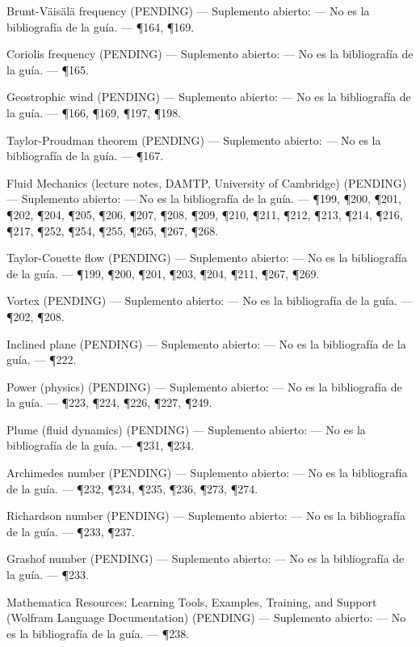\documentclass[10pt,openany]{book}
\begin{document}
\noindent Brunt-Väisälä frequency (PENDING) --- Suplemento abierto: --- No es la bibliografía de la guía. --- \P164, \P169.\par
\noindent Coriolis frequency (PENDING) --- Suplemento abierto: --- No es la bibliografía de la guía. --- \P165.\par
\noindent Geostrophic wind (PENDING) --- Suplemento abierto: --- No es la bibliografía de la guía. --- \P166, \P169, \P197, \P198.\par
\noindent Taylor-Proudman theorem (PENDING) --- Suplemento abierto: --- No es la bibliografía de la guía. --- \P167.\par
\noindent Fluid Mechanics (lecture notes, DAMTP, University of Cambridge) (PENDING) --- Suplemento abierto: --- No es la bibliografía de la guía. --- \P199, \P200, \P201, \P202, \P204, \P205, \P206, \P207, \P208, \P209, \P210, \P211, \P212, \P213, \P214, \P216, \P217, \P252, \P254, \P255, \P265, \P267, \P268.\par
\noindent Taylor-Couette flow (PENDING) --- Suplemento abierto: --- No es la bibliografía de la guía. --- \P199, \P200, \P201, \P203, \P204, \P211, \P267, \P269.\par
\noindent Vortex (PENDING) --- Suplemento abierto: --- No es la bibliografía de la guía. --- \P202, \P208.\par
\noindent Inclined plane (PENDING) --- Suplemento abierto: --- No es la bibliografía de la guía. --- \P222.\par
\noindent Power (physics) (PENDING) --- Suplemento abierto: --- No es la bibliografía de la guía. --- \P223, \P224, \P226, \P227, \P249.\par
\noindent Plume (fluid dynamics) (PENDING) --- Suplemento abierto: --- No es la bibliografía de la guía. --- \P231, \P234.\par
\noindent Archimedes number (PENDING) --- Suplemento abierto: --- No es la bibliografía de la guía. --- \P232, \P234, \P235, \P236, \P273, \P274.\par
\noindent Richardson number (PENDING) --- Suplemento abierto: --- No es la bibliografía de la guía. --- \P233, \P237.\par
\noindent Grashof number (PENDING) --- Suplemento abierto: --- No es la bibliografía de la guía. --- \P233.\par
\noindent Mathematica Resources: Learning Tools, Examples, Training, and Support (Wolfram Language Documentation) (PENDING) --- Suplemento abierto: --- No es la bibliografía de la guía. --- \P238.\par
\end{document}
